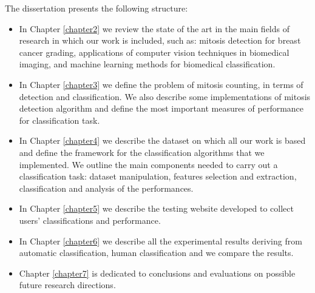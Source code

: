 
\noindent The dissertation presents the following structure:

\begin{itemize}
 \item In Chapter \ref{chapter2} we review the state of the art in the main fields of research in which our 
 work is included, such as: mitosis detection for breast cancer grading, applications of computer vision techniques
 in biomedical imaging, and machine learning methods for biomedical classification.
 \item In Chapter \ref{chapter3} we define the problem of mitosis counting, in terms of detection and classification.
 We also describe some implementations of mitosis detection algorithm and define the most important measures of performance for classification task.
 \item In Chapter \ref{chapter4} we describe the dataset on which all our work is based and define the framework for the classification algorithms that
 we implemented. We outline the main components needed to carry out a classification task: dataset manipulation, features selection and extraction, 
 classification and analysis of the performances.
 \item In Chapter \ref{chapter5} we describe the testing website developed to collect users' classifications and performance.
 \item In Chapter \ref{chapter6} we describe all the experimental results deriving from automatic classification, human classification and we compare
 the results.
 \item Chapter \ref{chapter7} is dedicated to conclusions and evaluations on possible future research directions.
\end{itemize}

